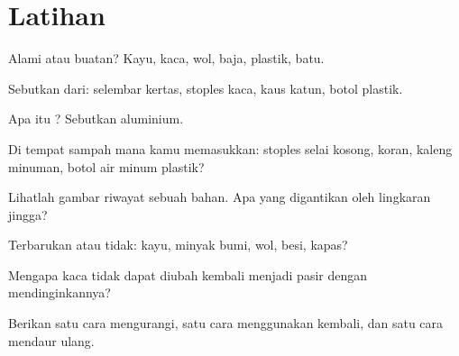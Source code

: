 \section{Latihan}

\begin{exercise}[$\star$]\label{exo:g5:raw-materials-and-recycling:1}
Alami atau buatan? Kayu, kaca, wol, baja, plastik, batu.
\end{exercise}

\begin{exercise}[$\star$]\label{exo:g5:raw-materials-and-recycling:2}
Sebutkan  dari: selembar kertas, stoples kaca, kaus katun,
botol plastik.
\end{exercise}

\begin{exercise}[$\star$]\label{exo:g5:raw-materials-and-recycling:3}
Apa itu ? Sebutkan  aluminium.
\end{exercise}

\begin{exercise}[$\star$]\label{exo:g5:raw-materials-and-recycling:4}
Di tempat sampah mana kamu memasukkan: stoples selai kosong, koran,
kaleng minuman, botol air minum plastik?
\end{exercise}

\begin{exercise}[$\star$]\label{exo:g5:raw-materials-and-recycling:5}
Lihatlah gambar riwayat sebuah bahan. Apa yang digantikan oleh
lingkaran jingga?
\end{exercise}

\begin{exercise}[$\star$]\label{exo:g5:raw-materials-and-recycling:6}
Terbarukan atau tidak: kayu, minyak bumi, wol,  besi, kapas?
\end{exercise}

\begin{exercise}[$\star$]\label{exo:g5:raw-materials-and-recycling:7}
Mengapa kaca tidak dapat diubah kembali menjadi pasir dengan
mendinginkannya?
\end{exercise}

\begin{exercise}[$\star$]\label{exo:g5:raw-materials-and-recycling:8}
Berikan satu cara mengurangi, satu cara menggunakan kembali, dan satu
cara mendaur ulang.
\end{exercise}

